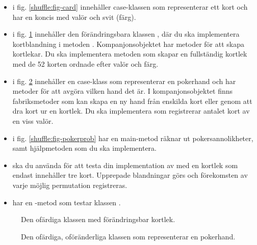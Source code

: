 \begin{itemize}
\item {} i fig. \ref{shuffle:fig-card} innehåller case-klassen  som representerar ett kort och har en koncis  med valör och svit (färg). 

\item {} i fig. \ref{shuffle:fig-deck} innehåller den förändringsbara klassen , där du ska implementera kortblandning i metoden . Kompanjonsobjektet har metoder för att skapa kortlekar. Du ska implementera metoden  som skapar en fullständig kortlek med de 52 korten ordnade efter valör och färg.

\item {} i fig. \ref{shuffle:fig-hand} innehåller en case-klass  som representerar en pokerhand och har metoder för att avgöra vilken hand det är. I kompanjonsobjektet finns fabriksmetoder som kan skapa en ny hand från enskilda kort eller genom att dra kort ur en kortlek. Du ska implementera  som registrerar antalet kort av en viss valör. 

\item {} i fig. \ref{shuffle:fig-pokerprob}  har en main-metod räknar ut pokersannolikheter, samt hjälpmetoden  som du ska implementera.

\item {} ska du använda för att testa din implementation av  med en kortlek som endast innehåller tre kort. Upprepade blandningar görs och förekomsten av varje möjlig permutation  registreras.

\item {} har en -metod som testar klassen .

\end{itemize}

\begin{figure}
\caption{Den ofärdiga klassen  med förändringsbar kortlek.}
\label{shuffle:fig-deck}
\end{figure}

\begin{figure}
\caption{Den ofärdiga, oföränderliga klassen  som representerar en pokerhand.}
\label{shuffle:fig-hand}
\end{figure}

